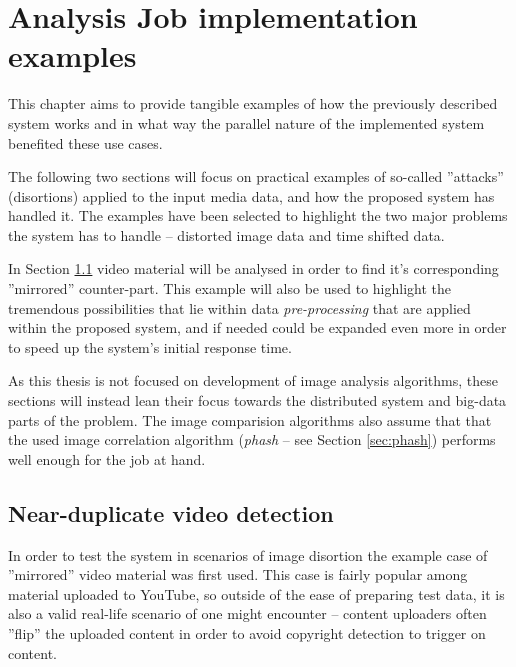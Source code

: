\chapter{Analysis Job implementation examples}
\label{chap:analysis-examples}

This chapter aims to provide tangible examples of how the previously described system works and in what way the parallel nature of the implemented system benefited these use cases.

The following two sections will focus on practical examples of so-called ''attacks'' (disortions) applied to the input media data, and how the proposed system has handled it. The examples have been selected to highlight the two major problems the system has to handle -- distorted image data and time shifted data.

In Section \ref{sec:mirrored-video-detection} video material will be analysed in order to find it's corresponding ''mirrored'' counter-part. This example will also be used to highlight the tremendous possibilities that lie within data \textit{pre-processing} that are applied within the proposed system, and if needed could be expanded even more in order to speed up the system's initial response time.


As this thesis is not focused on development of image analysis algorithms, these sections will instead lean their focus towards the distributed system and big-data parts of the problem. The image comparision algorithms also assume that that the used image correlation algorithm (\textit{phash} -- see Section \ref{sec:phash}) performs well enough for the job at hand. 


\section{Near-duplicate video detection}
\label{sec:mirrored-video-detection}
In order to test the system in scenarios of image disortion the example case of ''mirrored'' video material was first used. This case is fairly popular among material uploaded to YouTube, so outside of the ease of preparing test data, it is also a valid real-life scenario of one might encounter -- content uploaders often ''flip'' the uploaded content in order to avoid copyright detection to trigger on content.

